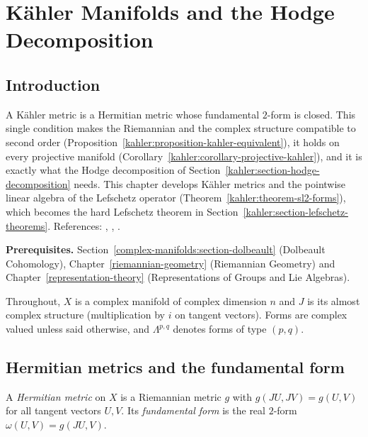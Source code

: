 \chapter{K\"ahler Manifolds and the Hodge Decomposition}\label{kahler}

\section{Introduction}\label{kahler:section-introduction}

A K\"ahler metric is a Hermitian metric whose fundamental $2$-form is closed. This single condition makes the Riemannian and the complex
structure compatible to second order (Proposition~\ref{kahler:proposition-kahler-equivalent}), it holds on every projective manifold
(Corollary~\ref{kahler:corollary-projective-kahler}), and it is exactly what the Hodge decomposition of Section~\ref{kahler:section-hodge-decomposition}
needs. This chapter develops K\"ahler metrics and the pointwise linear algebra of the Lefschetz operator
(Theorem~\ref{kahler:theorem-sl2-forms}), which becomes the hard Lefschetz theorem in Section~\ref{kahler:section-lefschetz-theorems}. References:
\cite[Chapter 0]{griffiths-harris}, \cite[Chapters 1 and 3]{huybrechts-complex}, \cite[Chapters 3 and 6]{voisin-hodge-1}.

\noindent\textbf{Prerequisites.} Section~\ref{complex-manifolds:section-dolbeault} (Dolbeault Cohomology), Chapter~\ref{riemannian-geometry} (Riemannian
Geometry) and Chapter~\ref{representation-theory} (Representations of Groups and Lie Algebras).

Throughout, $X$ is a complex manifold of complex dimension $n$ and $J$ is its almost complex structure (multiplication by $i$ on tangent
vectors). Forms are complex valued unless said otherwise, and $\Lambda^{p,q}$ denotes forms of type $(p,q)$.

\section{Hermitian metrics and the fundamental form}\label{kahler:section-hermitian}

\begin{definition}\label{kahler:definition-hermitian}
A \emph{Hermitian metric} on $X$ is a Riemannian metric $g$ with $g(JU, JV) = g(U, V)$ for all tangent vectors $U, V$. Its
\emph{fundamental form} is the real $2$-form $\omega(U, V) = g(JU, V)$.
\end{definition}

